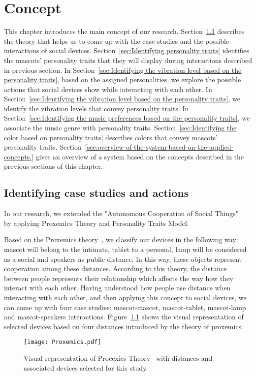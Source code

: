 \chapter{Concept}
\label{ch:concept}

This chapter introduces the main concept of our research.
Section~\ref{sec:Identifying case studies and actions} describes the theory that helps us
to come up with the case-studies and the possible interactions of social devices.
Section~\ref{sec:Identifying personality traits} identifies the mascots' personality traits
that they will display during interactions described in previous section.
In Section~\ref{sec:Identifying the vibration level based on the personality traits},
based on the assigned personalities, we explore the possible actions
that social devices show while interacting with each other.
In Section~\ref{sec:Identifying the vibration level based on the personality traits},
we identify the vibration levels that convey personality traits.
In Section~\ref{sec:Identifying the music preferences based on the personality traits},
we associate the music genre with personality traits.
Section~\ref{sec:Identifying the color based on personality traits} describes
colors that convey mascots' personality traits.
Section~\ref{sec:overview-of-the-system-based-on-the-applied-concepts.} gives an overview of a system
based on the concepts described in the previous sections of this chapter.

\section{Identifying case studies and actions}
\label{sec:Identifying case studies and actions}

In our research, we extended the "Autonomous Cooperation of Social Things" ~\cite{okada2016autonomous}
by applying Proxemics Theory and Personality Traits Model.

Based on the Proxemics theory~\cite{hall1966hidden, hall1963system}, we classify our devices in the following way:
mascot will belong to the intimate, tablet to a personal,
lamp will be considered as a social and speakers as public distance.
In this way, these objects represent cooperation among these distances.
According to this theory, the distance between people represents their
relationship which affects the way how they interact with each other.
Having understood how people use distance when interacting with each other,
and then applying this concept to social devices, we can come up with four case studies:
mascot-mascot, mascot-tablet, mascot-lamp and mascot-speakers interactions.
Figure~\ref{fig:Proxemics} shows the visual representation of selected devices based on
four distances introduced by the theory of proxemics.
\begin{figure}[hbt!]
    \centering
    \texttt{[image: Proxemics.pdf]}
    \caption{Visual representation of Procexics Theory~\cite{hall1966hidden, hall1963system} with distances and associated devices selected for
    this study.}
    \label{fig:Proxemics}
\end{figure}

